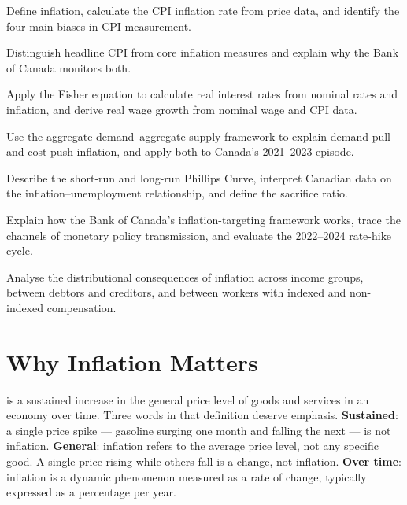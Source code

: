 \begin{learningobjectives}
  \item Define inflation, calculate the CPI inflation rate from price
        data, and identify the four main biases in CPI measurement.
  \item Distinguish headline CPI from core inflation measures and explain
        why the Bank of Canada monitors both.
  \item Apply the Fisher equation to calculate real interest rates from
        nominal rates and inflation, and derive real wage growth from
        nominal wage and CPI data.
  \item Use the aggregate demand--aggregate supply framework to explain
        demand-pull and cost-push inflation, and apply both to Canada's
        2021--2023 episode.
  \item Describe the short-run and long-run Phillips Curve, interpret
        Canadian data on the inflation--unemployment relationship, and
        define the sacrifice ratio.
  \item Explain how the Bank of Canada's inflation-targeting framework
        works, trace the channels of monetary policy transmission, and
        evaluate the 2022--2024 rate-hike cycle.
  \item Analyse the distributional consequences of inflation across
        income groups, between debtors and creditors, and between
        workers with indexed and non-indexed compensation.
\end{learningobjectives}

\section{Why Inflation Matters}

 is a sustained increase in the general price level of goods
and services in an economy over time. Three words in that definition deserve
emphasis. \textbf{Sustained}: a single price spike --- gasoline surging one
month and falling the next --- is not inflation. \textbf{General}: inflation
refers to the average price level, not any specific good. A single price
rising while others fall is a  change, not inflation.
\textbf{Over time}: inflation is a dynamic phenomenon measured as a rate
of change, typically expressed as a percentage per year.

